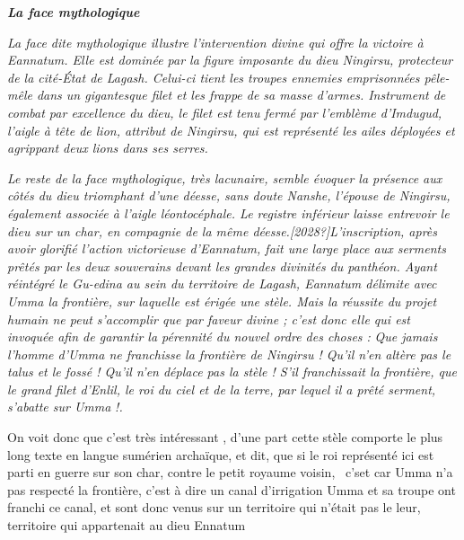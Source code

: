 \documentclass[a4paper]{article}
\begin{document}
\bigskip


\bigskip

{
\textbf{\textit{La face {\textquotedbl}mythologique{\textquotedbl}}}}


\bigskip

{
\textit{La face dite {\textquotedbl}mythologique{\textquotedbl} illustre
l'intervention divine qui offre la victoire à Eannatum. Elle est
dominée par la figure imposante du dieu Ningirsu, protecteur de la
cité-État de Lagash. Celui-ci tient les troupes ennemies emprisonnées
pêle-mêle dans un gigantesque filet et les frappe de sa masse d'armes.
Instrument de combat par excellence du dieu, le filet est tenu fermé
par l'emblème d'Imdugud, l'aigle à tête de lion, attribut de Ningirsu,
qui est représenté les ailes déployées et agrippant deux lions dans ses
serres.}}

{
\textit{Le reste de la face {\textquotedbl}mythologique{\textquotedbl},
très lacunaire, semble évoquer la présence aux côtés du dieu triomphant
d'une déesse, sans doute Nanshe, l'épouse de Ningirsu, également
associée à l'aigle léontocéphale. Le registre inférieur laisse
entrevoir le dieu sur un char, en compagnie de la même
déesse.[2028?]L'inscription, après avoir glorifié l'action victorieuse
d'Eannatum, fait une large place aux serments prêtés par les deux
souverains devant les grandes divinités du panthéon. Ayant réintégré le
Gu-edina au sein du territoire de Lagash, Eannatum délimite avec Umma
la frontière, sur laquelle est érigée une stèle. Mais la réussite du
projet humain ne peut s'accomplir que par faveur divine ; c'est donc
elle qui est invoquée afin de garantir la pérennité du nouvel ordre des
choses : {\textquotedbl}}\textit{Que jamais l'homme d'Umma ne
franchisse la frontière de Ningirsu ! Qu'il n'en altère pas le talus et
le fossé ! Qu'il n'en déplace pas la stèle ! S'il franchissait la
frontière, que le grand filet d'Enlil, le roi du ciel et de la terre,
par lequel il a prêté serment, s'abatte sur Umma
}\textit{!{\textquotedbl}.}}


\bigskip


\bigskip

{
On voit donc que c'est très intéressant , d'une part cette stèle
comporte le plus long texte en langue sumérien archaïque, et dit, que
si le roi représenté ici est parti en guerre sur son char, contre le
petit royaume voisin, \ c'set car Umma n'a pas respecté la frontière,
c'est à dire un canal d'irrigation Umma et sa troupe ont franchi ce
canal, et sont donc venus sur un territoire qui n'était pas le leur,
territoire qui appartenait au dieu Ennatum}
\end{document}
